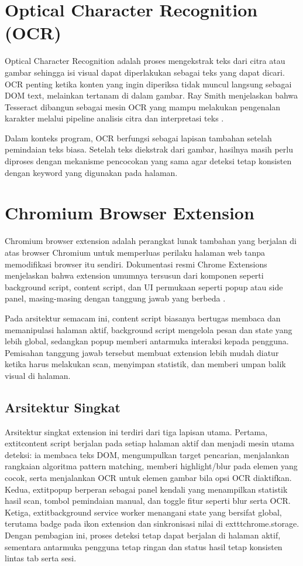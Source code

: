 \section{Optical Character Recognition (OCR)}

Optical Character Recognition adalah proses mengekstrak teks dari citra atau gambar sehingga isi visual dapat diperlakukan sebagai teks yang dapat dicari. OCR penting ketika konten yang ingin diperiksa tidak muncul langsung sebagai DOM text, melainkan tertanam di dalam gambar. Ray Smith menjelaskan bahwa Tesseract dibangun sebagai mesin OCR yang mampu melakukan pengenalan karakter melalui pipeline analisis citra dan interpretasi teks \cite{smith2007tesseract}.

Dalam konteks program, OCR berfungsi sebagai lapisan tambahan setelah pemindaian teks biasa. Setelah teks diekstrak dari gambar, hasilnya masih perlu diproses dengan mekanisme pencocokan yang sama agar deteksi tetap konsisten dengan keyword yang digunakan pada halaman.

\section{Chromium Browser Extension}

Chromium browser extension adalah perangkat lunak tambahan yang berjalan di atas browser Chromium untuk memperluas perilaku halaman web tanpa memodifikasi browser itu sendiri. Dokumentasi resmi Chrome Extensions menjelaskan bahwa extension umumnya tersusun dari komponen seperti background script, content script, dan UI permukaan seperti popup atau side panel, masing-masing dengan tanggung jawab yang berbeda \cite{chromeextdocs}.

Pada arsitektur semacam ini, content script biasanya bertugas membaca dan memanipulasi halaman aktif, background script mengelola pesan dan state yang lebih global, sedangkan popup memberi antarmuka interaksi kepada pengguna. Pemisahan tanggung jawab tersebut membuat extension lebih mudah diatur ketika harus melakukan scan, menyimpan statistik, dan memberi umpan balik visual di halaman.

\subsection{Arsitektur Singkat}

Arsitektur singkat extension ini terdiri dari tiga lapisan utama. Pertama, 	extit{content script} berjalan pada setiap halaman aktif dan menjadi mesin utama deteksi: ia membaca teks DOM, mengumpulkan target pencarian, menjalankan rangkaian algoritma pattern matching, memberi highlight/blur pada elemen yang cocok, serta menjalankan OCR untuk elemen gambar bila opsi OCR diaktifkan. Kedua, 	extit{popup} berperan sebagai panel kendali yang menampilkan statistik hasil scan, tombol pemindaian manual, dan toggle fitur seperti blur serta OCR. Ketiga, 	extit{background service worker} menangani state yang bersifat global, terutama badge pada ikon extension dan sinkronisasi nilai di 	exttt{chrome.storage}. Dengan pembagian ini, proses deteksi tetap dapat berjalan di halaman aktif, sementara antarmuka pengguna tetap ringan dan status hasil tetap konsisten lintas tab serta sesi.


